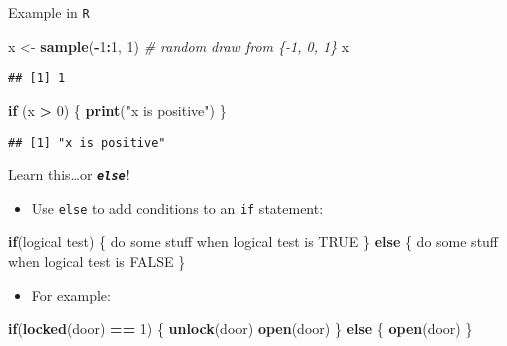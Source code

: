 \documentclass[ignorenonframetext,]{beamer}
\newenvironment{Shaded}{\begin{snugshade}}{\end{snugshade}}
\newcommand{\KeywordTok}[1]{\textcolor[rgb]{0.13,0.29,0.53}{\textbf{#1}}}
\newcommand{\DecValTok}[1]{\textcolor[rgb]{0.00,0.00,0.81}{#1}}
\newcommand{\StringTok}[1]{\textcolor[rgb]{0.31,0.60,0.02}{#1}}
\newcommand{\CommentTok}[1]{\textcolor[rgb]{0.56,0.35,0.01}{\textit{#1}}}
\newcommand{\OtherTok}[1]{\textcolor[rgb]{0.56,0.35,0.01}{#1}}
\newcommand{\ControlFlowTok}[1]{\textcolor[rgb]{0.13,0.29,0.53}{\textbf{#1}}}
\newcommand{\OperatorTok}[1]{\textcolor[rgb]{0.81,0.36,0.00}{\textbf{#1}}}
\newcommand{\NormalTok}[1]{#1}
\providecommand{\tightlist}{%
	\setlength{\itemsep}{0pt}\setlength{\parskip}{0pt}}
\begin{document}
\begin{frame}[fragile]{Example in \texttt{R}}

\begin{Shaded}
\begin{Highlighting}[]
\NormalTok{x <-}\StringTok{ }\KeywordTok{sample}\NormalTok{(}\OperatorTok{-}\DecValTok{1}\OperatorTok{:}\DecValTok{1}\NormalTok{, }\DecValTok{1}\NormalTok{) }\CommentTok{# random draw from \{-1, 0, 1\}}
\NormalTok{x}
\end{Highlighting}
\end{Shaded}

\begin{verbatim}
## [1] 1
\end{verbatim}

\begin{Shaded}
\begin{Highlighting}[]
\ControlFlowTok{if}\NormalTok{ (x }\OperatorTok{>}\StringTok{ }\DecValTok{0}\NormalTok{) \{}
  \KeywordTok{print}\NormalTok{(}\StringTok{"x is positive"}\NormalTok{)}
\NormalTok{\}}
\end{Highlighting}
\end{Shaded}

\begin{verbatim}
## [1] "x is positive"
\end{verbatim}

\end{frame}

\begin{frame}[fragile]{Learn this\ldots{}or
\textbf{\emph{\texttt{else}}}!}

\begin{itemize}
\tightlist
\item
  Use \texttt{else} to add conditions to an \texttt{if} statement:
\end{itemize}

\begin{Shaded}
\begin{Highlighting}[]
\ControlFlowTok{if}\NormalTok{(logical test) \{}
\NormalTok{  do some stuff when logical test is }\OtherTok{TRUE}
\NormalTok{\} }\ControlFlowTok{else}\NormalTok{ \{}
\NormalTok{  do some stuff when logical test is }\OtherTok{FALSE}
\NormalTok{\}}
\end{Highlighting}
\end{Shaded}

\begin{itemize}
\tightlist
\item
  For example:
\end{itemize}

\begin{Shaded}
\begin{Highlighting}[]
\ControlFlowTok{if}\NormalTok{(}\KeywordTok{locked}\NormalTok{(door) }\OperatorTok{==}\StringTok{ }\DecValTok{1}\NormalTok{) \{}
  \KeywordTok{unlock}\NormalTok{(door)}
  \KeywordTok{open}\NormalTok{(door)}
\NormalTok{\} }\ControlFlowTok{else}\NormalTok{ \{}
  \KeywordTok{open}\NormalTok{(door)}
\NormalTok{\}}
\end{Highlighting}
\end{Shaded}

\end{frame}
\end{document}
